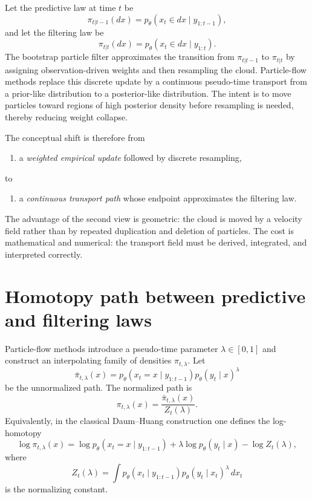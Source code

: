 Let the predictive law at time $t$ be
\[
  \pi_{t|t-1}(dx) = p_\theta(x_t \in dx \mid y_{1:t-1}),
\]
and let the filtering law be
\[
  \pi_{t|t}(dx) = p_\theta(x_t \in dx \mid y_{1:t}).
\]
The bootstrap particle filter approximates the transition from
$\pi_{t|t-1}$ to $\pi_{t|t}$ by assigning observation-driven weights and then
resampling the cloud.  Particle-flow methods replace this discrete update by a
continuous pseudo-time transport from a prior-like distribution to a
posterior-like distribution.  The intent is to move particles toward regions of
high posterior density before resampling is needed, thereby reducing weight
collapse.

The conceptual shift is therefore from
\begin{enumerate}[label=(\roman*)]
  \item a \emph{weighted empirical update} followed by discrete resampling,
\end{enumerate}
to
\begin{enumerate}[label=(\roman*),resume]
  \item a \emph{continuous transport path} whose endpoint approximates the
    filtering law.
\end{enumerate}
The advantage of the second view is geometric: the cloud is moved by a velocity
field rather than by repeated duplication and deletion of particles.  The cost
is mathematical and numerical: the transport field must be derived, integrated,
and interpreted correctly.

\section{Homotopy path between predictive and filtering laws}
\label{sec:bf-pff-homotopy}

Particle-flow methods introduce a pseudo-time parameter
$\lambda \in [0,1]$ and construct an interpolating family of densities
$\pi_{t,\lambda}$.  Let
\[
  \bar\pi_{t,\lambda}(x)
  =
  p_\theta(x_t=x \mid y_{1:t-1})
  p_\theta(y_t \mid x)^\lambda
\]
be the unnormalized path.  The normalized path is
\[
  \pi_{t,\lambda}(x)
  =
  \frac{\bar\pi_{t,\lambda}(x)}{Z_t(\lambda)}.
\]
Equivalently, in the classical Daum--Huang construction one defines the
log-homotopy
\begin{equation}
\label{eq:bf-pff-log-homotopy}
  \log \pi_{t,\lambda}(x)
  = \log p_\theta(x_t=x \mid y_{1:t-1})
    + \lambda \log p_\theta(y_t \mid x)
    - \log Z_t(\lambda),
\end{equation}
where
\begin{equation}
\label{eq:bf-pff-homotopy-normalizer}
  Z_t(\lambda)
  = \int p_\theta(x_t \mid y_{1:t-1})
      p_\theta(y_t \mid x_t)^\lambda\,dx_t
\end{equation}
is the normalizing constant.

